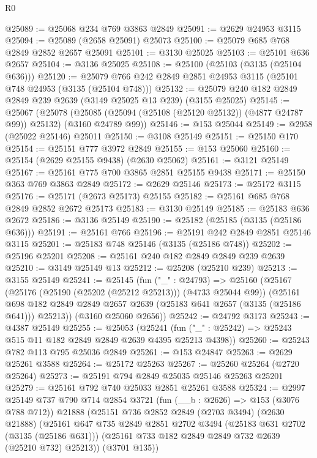 \begin{lexlean}{R0}
\begin{coremodule}
@25089 := @25068 @234 @769 @3863 @2849
@25091 := @2629 @24953 @3115
@25094 := @25089 (@2658 @25091) @25073
@25100 := @25079 @685 @768 @2849 @2852 @2657 @25091
@25101 := @3130 @25025
@25103 := @25101 @636 @2657
@25104 := @3136 @25025
@25108 := @25100 (@25103 (@3135 (@25104 @636)))
@25120 := @25079 @766 @242 @2849 @2851 @24953 @3115 (@25101 @748 @24953 (@3135 (@25104 @748)))
@25132 := @25079 @240 @182 @2849 @2849 @239 @2639 (@3149 @25025 @13 @239) (@3155 @25025)
@25145 := @25067
    (@25078 (@25085 (@25094 (@25108 (@25120 @25132)) (@4877 @24787 @99)) @25132) (@3160 @24789 @99))
@25146 := @153 @25044
@25149 := @2958 (@25022 @25146) @25011
@25150 := @3108 @25149
@25151 := @25150 @170
@25154 := @25151 @777 @3972 @2849
@25155 := @153 @25060
@25160 := @25154 (@2629 @25155 @9438) (@2630 @25062)
@25161 := @3121 @25149
@25167 := @25161 @775 @700 @3865 @2851 @25155 @9438
@25171 := @25150 @363 @769 @3863 @2849
@25172 := @2629 @25146
@25173 := @25172 @3115
@25176 := @25171 (@2673 @25173) @25155
@25182 := @25161 @685 @768 @2849 @2852 @2672 @25173
@25183 := @3130 @25149
@25185 := @25183 @636 @2672
@25186 := @3136 @25149
@25190 := @25182 (@25185 (@3135 (@25186 @636)))
@25191 := @25161 @766
@25196 := @25191 @242 @2849 @2851 @25146 @3115
@25201 := @25183 @748 @25146 (@3135 (@25186 @748))
@25202 := @25196 @25201
@25208 := @25161 @240 @182 @2849 @2849 @239 @2639
@25210 := @3149 @25149 @13
@25212 := @25208 (@25210 @239)
@25213 := @3155 @25149
@25241 := @25145
    (fun ("_" : @24793) =>
    @25160
      (@25167
        (@25176 (@25190 (@25202 (@25212 @25213))) (@4733 @25044 @99))
        (@25161 @698 @182 @2849 @2849 @2657 @2639 (@25183 @641 @2657 (@3135 (@25186 @641))) @25213))
      (@3160 @25060 @2656))
@25242 := @24792 @3173
@25243 := @4387 @25149
@25255 := @25053
    (@25241 (fun ("_" : @25242) => @25243 @515 @11 @182 @2849 @2849 @2639 @4395 @25213 @4398))
@25260 := @25243 @782 @113 @795 @25036 @2849
@25261 := @153 @24847
@25263 := @2629 @25261 @3588
@25264 := @25172 @25263
@25267 := @25260 @25264 (@2720 @25264)
@25273 := @25191 @794 @2849 @25035 @25146 @25263 @25201
@25279 := @25161 @792 @740 @25033 @2851 @25261 @3588
@25324 := @2997
    @25149
    @737
    @790
    @714
    @2854
    @3721
    (fun (__b : @2626) => @153 (@3076 @788 @712))
    @21888
    (@25151
      @736
      @2852
      @2849
      (@2703 @3494)
      (@2630 @21888)
      (@25161
        @647
        @735
        @2849
        @2851
        @2702
        @3494
        (@25183 @631 @2702 (@3135 (@25186 @631)))
        (@25161 @733 @182 @2849 @2849 @732 @2639 (@25210 @732) @25213))
      (@3701 @135))

\end{coremodule}
\end{lexlean}
